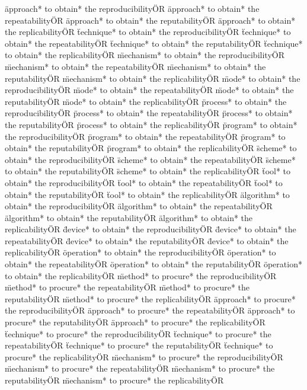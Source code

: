 \documentclass[
10pt, %
a4paper, %
oneside, %
headinclude,footinclude, %
BCOR5mm, %
]{scrartcl}
\begin{document}
\"approach* to obtain* the reproducibility\" OR \"approach* to obtain* the repeatability\" OR \"approach* to obtain* the reputability\" OR \"approach* to obtain* the replicability\" OR 
\"technique* to obtain* the reproducibility\" OR \"technique* to obtain* the repeatability\" OR \"technique* to obtain* the reputability\" OR \"technique* to obtain* the replicability\" OR 
\"mechanism* to obtain* the reproducibility\" OR \"mechanism* to obtain* the repeatability\" OR \"mechanism* to obtain* the reputability\" OR \"mechanism* to obtain* the replicability\" OR 
\"mode* to obtain* the reproducibility\" OR \"mode* to obtain* the repeatability\" OR \"mode* to obtain* the reputability\" OR \"mode* to obtain* the replicability\" OR 
\"process* to obtain* the reproducibility\" OR \"process* to obtain* the repeatability\" OR \"process* to obtain* the reputability\" OR \"process* to obtain* the replicability\" OR 
\"program* to obtain* the reproducibility\" OR \"program* to obtain* the repeatability\" OR \"program* to obtain* the reputability\" OR \"program* to obtain* the replicability\" OR 
\"scheme* to obtain* the reproducibility\" OR \"scheme* to obtain* the repeatability\" OR \"scheme* to obtain* the reputability\" OR \"scheme* to obtain* the replicability\" OR 
\"tool* to obtain* the reproducibility\" OR \"tool* to obtain* the repeatability\" OR \"tool* to obtain* the reputability\" OR \"tool* to obtain* the replicability\" OR 
\"algorithm* to obtain* the reproducibility\" OR \"algorithm* to obtain* the repeatability\" OR \"algorithm* to obtain* the reputability\" OR \"algorithm* to obtain* the replicability\" OR 
\"device* to obtain* the reproducibility\" OR \"device* to obtain* the repeatability\" OR \"device* to obtain* the reputability\" OR \"device* to obtain* the replicability\" OR 
\"operation* to obtain* the reproducibility\" OR \"operation* to obtain* the repeatability\" OR \"operation* to obtain* the reputability\" OR \"operation* to obtain* the replicability\" OR 
\"method* to procure* the reproducibility\" OR \"method* to procure* the repeatability\" OR \"method* to procure* the reputability\" OR \"method* to procure* the replicability\" OR 
\"approach* to procure* the reproducibility\" OR \"approach* to procure* the repeatability\" OR \"approach* to procure* the reputability\" OR \"approach* to procure* the replicability\" OR 
\"technique* to procure* the reproducibility\" OR \"technique* to procure* the repeatability\" OR \"technique* to procure* the reputability\" OR \"technique* to procure* the replicability\" OR 
\"mechanism* to procure* the reproducibility\" OR \"mechanism* to procure* the repeatability\" OR \"mechanism* to procure* the reputability\" OR \"mechanism* to procure* the replicability\" OR 
\end{document}
